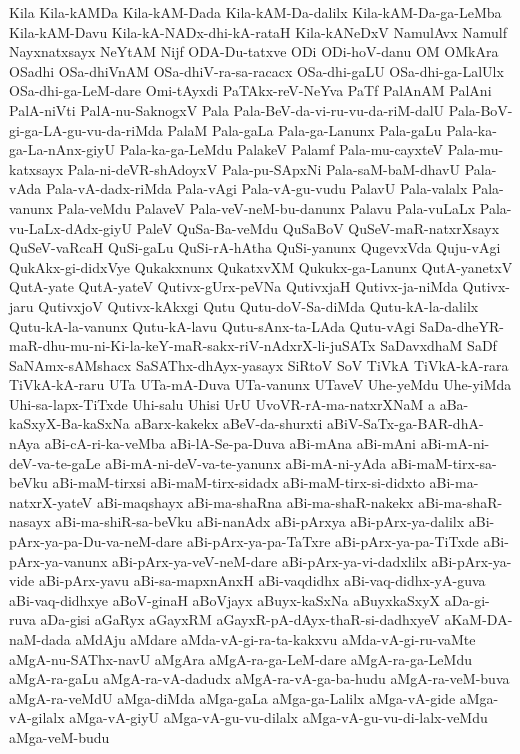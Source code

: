 {Kila
Kila-kAMDa
Kila-kAM-Dada
Kila-kAM-Da-dalilx
Kila-kAM-Da-ga-LeMba
Kila-kAM-Davu
Kila-kA-NADx-dhi-kA-rataH
Kila-kANeDxV
NamulAvx
Namulf
Nayxnatxsayx
NeYtAM
Nijf
ODA-Du-tatxve
ODi
ODi-hoV-danu
OM
OMkAra
OSadhi
OSa-dhiVnAM
OSa-dhiV-ra-sa-racacx
OSa-dhi-gaLU
OSa-dhi-ga-LalUlx
OSa-dhi-ga-LeM-dare
Omi-tAyxdi
PaTAkx-reV-NeYva
PaTf
PalAnAM
PalAni
PalA-niVti
PalA-nu-SaknogxV
Pala
Pala-BeV-da-vi-ru-vu-da-riM-dalU
Pala-BoV-gi-ga-LA-gu-vu-da-riMda
PalaM
Pala-gaLa
Pala-ga-Lanunx
Pala-gaLu
Pala-ka-ga-La-nAnx-giyU
Pala-ka-ga-LeMdu
PalakeV
Palamf
Pala-mu-cayxteV
Pala-mu-katxsayx
Pala-ni-deVR-shAdoyxV
Pala-pu-SApxNi
Pala-saM-baM-dhavU
Pala-vAda
Pala-vA-dadx-riMda
Pala-vAgi
Pala-vA-gu-vudu
PalavU
Pala-valalx
Pala-vanunx
Pala-veMdu
PalaveV
Pala-veV-neM-bu-danunx
Palavu
Pala-vuLaLx
Pala-vu-LaLx-dAdx-giyU
PaleV
QuSa-Ba-veMdu
QuSaBoV
QuSeV-maR-natxrXsayx
QuSeV-vaRcaH
QuSi-gaLu
QuSi-rA-hAtha
QuSi-yanunx
QugevxVda
Quju-vAgi
QukAkx-gi-didxVye
Qukakxnunx
QukatxvXM
Qukukx-ga-Lanunx
QutA-yanetxV
QutA-yate
QutA-yateV
Qutivx-gUrx-peVNa
QutivxjaH
Qutivx-ja-niMda
Qutivx-jaru
QutivxjoV
Qutivx-kAkxgi
Qutu
Qutu-doV-Sa-diMda
Qutu-kA-la-dalilx
Qutu-kA-la-vanunx
Qutu-kA-lavu
Qutu-sAnx-ta-LAda
Qutu-vAgi
SaDa-dheYR-maR-dhu-mu-ni-Ki-la-keY-maR-sakx-riV-nAdxrX-li-juSATx
SaDavxdhaM
SaDf
SaNAmx-sAMshacx
SaSAThx-dhAyx-yasayx
SiRtoV
SoV
TiVkA
TiVkA-kA-rara
TiVkA-kA-raru
UTa
UTa-mA-Duva
UTa-vanunx
UTaveV
Uhe-yeMdu
Uhe-yiMda
Uhi-sa-lapx-TiTxde
Uhi-salu
Uhisi
UrU
UvoVR-rA-ma-natxrXNaM
a
aBa-kaSxyX-Ba-kaSxNa
aBarx-kakekx
aBeV-da-shurxti
aBiV-SaTx-ga-BAR-dhA-nAya
aBi-cA-ri-ka-veMba
aBi-lA-Se-pa-Duva
aBi-mAna
aBi-mAni
aBi-mA-ni-deV-va-te-gaLe
aBi-mA-ni-deV-va-te-yanunx
aBi-mA-ni-yAda
aBi-maM-tirx-sa-beVku
aBi-maM-tirxsi
aBi-maM-tirx-sidadx
aBi-maM-tirx-si-didxto
aBi-ma-natxrX-yateV
aBi-maqshayx
aBi-ma-shaRna
aBi-ma-shaR-nakekx
aBi-ma-shaR-nasayx
aBi-ma-shiR-sa-beVku
aBi-nanAdx
aBi-pArxya
aBi-pArx-ya-dalilx
aBi-pArx-ya-pa-Du-va-neM-dare
aBi-pArx-ya-pa-TaTxre
aBi-pArx-ya-pa-TiTxde
aBi-pArx-ya-vanunx
aBi-pArx-ya-veV-neM-dare
aBi-pArx-ya-vi-dadxlilx
aBi-pArx-ya-vide
aBi-pArx-yavu
aBi-sa-mapxnAnxH
aBi-vaqdidhx
aBi-vaq-didhx-yA-guva
aBi-vaq-didhxye
aBoV-ginaH
aBoVjayx
aBuyx-kaSxNa
aBuyxkaSxyX
aDa-gi-ruva
aDa-gisi
aGaRyx
aGayxRM
aGayxR-pA-dAyx-thaR-si-dadhxyeV
aKaM-DA-naM-dada
aMdAju
aMdare
aMda-vA-gi-ra-ta-kakxvu
aMda-vA-gi-ru-vaMte
aMgA-nu-SAThx-navU
aMgAra
aMgA-ra-ga-LeM-dare
aMgA-ra-ga-LeMdu
aMgA-ra-gaLu
aMgA-ra-vA-dadudx
aMgA-ra-vA-ga-ba-hudu
aMgA-ra-veM-buva
aMgA-ra-veMdU
aMga-diMda
aMga-gaLa
aMga-ga-Lalilx
aMga-vA-gide
aMga-vA-gilalx
aMga-vA-giyU
aMga-vA-gu-vu-dilalx
aMga-vA-gu-vu-di-lalx-veMdu
aMga-veM-budu
}
